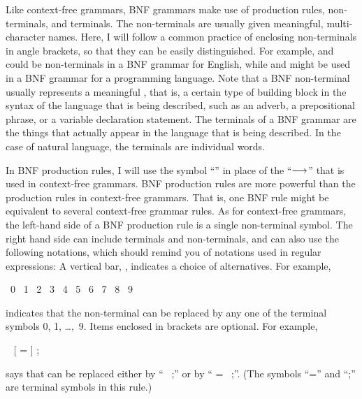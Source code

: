 Like context-free grammars, BNF grammars make use of production rules, non-terminals,
and terminals.  The non-terminals are usually given meaningful,
multi-character names.  Here, I will follow a common practice
of enclosing non-terminals in angle brackets, so that they can
be easily distinguished.  For example,  and 
could be non-terminals in a BNF grammar for English, while
 and  might be used in a BNF grammar
for a programming language.  Note that a BNF non-terminal
usually represents a meaningful ,
that is, a certain type of building block in the syntax of
the language that is being described, such as an adverb,
a prepositional phrase, or a variable declaration statement.
The terminals of a BNF grammar are the things that actually
appear in the language that is being described.  In the case
of natural language, the terminals are individual words.

In BNF production rules, I will use the symbol ``\BNFPRODUCES''
in place of the ``$\longrightarrow$'' that is used in context-free grammars.
BNF production rules are more powerful than the production rules in
context-free grammars.  That is, one BNF rule might be equivalent to 
several context-free grammar rules.  As for context-free grammars,
the left-hand side of a BNF production rule is a single 
non-terminal symbol.  The right hand side can include terminals
and non-terminals, and can also use the following notations,
which should remind you of notations used in regular expressions:
\smallskip
\IItem{$\bullet\,\,$}A vertical bar, \BNFALT, indicates a choice of
   alternatives.  For example,
   
\smallskip   
\centerline{ \BNFPRODUCES\ 0 \BNFALT\ 1 \BNFALT\ 2
          \BNFALT\ 3 \BNFALT\ 4 \BNFALT\ 5 \BNFALT\ 6 \BNFALT\ 7
          \BNFALT\ 8 \BNFALT\ 9}
          
\smallskip

\IItem{}indicates that the non-terminal  can be replaced
by any one of the terminal symbols 0, 1, \dots,~9.
\smallskip
\IItem{$\bullet\,\,$}Items enclosed in brackets are optional.  For example,

\smallskip
\centerline{ \BNFPRODUCES\  
                 [ =  ] ;}

\smallskip
\IItem{}says that  can be replaced either
by `` ~;'' or by `` 
= ~;''.
(The symbols ``='' and ``;'' are terminal symbols in this rule.)

